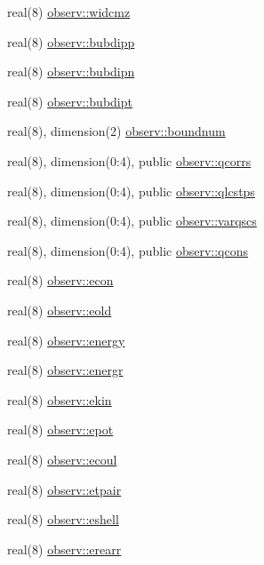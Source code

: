 \begin{DoxyCompactItemize}
\item 
real(8) \hyperlink{namespaceobserv_a128f96e19967460b67ef885021d9fb0a}{observ\+::widcmz}
\item 
real(8) \hyperlink{namespaceobserv_a4ffb7986e7585b019cc482528f6da8f7}{observ\+::bubdipp}
\item 
real(8) \hyperlink{namespaceobserv_a857bf3d3540f2e6896e8f13f0dc55642}{observ\+::bubdipn}
\item 
real(8) \hyperlink{namespaceobserv_a63fc9eb0b13b60cb7dc0df0c8c330966}{observ\+::bubdipt}
\item 
real(8), dimension(2) \hyperlink{namespaceobserv_aa4177808cf29e88750de09e971052d7c}{observ\+::boundnum}
\item 
real(8), dimension(0\+:4), public \hyperlink{namespaceobserv_a16d0b249b06168c260b7a7752729f60a}{observ\+::qcorrs}
\item 
real(8), dimension(0\+:4), public \hyperlink{namespaceobserv_a6a9c12cdfb362e6d2af583d7eb17d32f}{observ\+::qlcstps}
\item 
real(8), dimension(0\+:4), public \hyperlink{namespaceobserv_afbab940fd904214e88cead4570ed5a45}{observ\+::varqscs}
\item 
real(8), dimension(0\+:4), public \hyperlink{namespaceobserv_aa5526a16e8f0982dec32b788e8c13eae}{observ\+::qcons}
\item 
real(8) \hyperlink{namespaceobserv_aab2b361228c2be9aacc647898d20602c}{observ\+::econ}
\item 
real(8) \hyperlink{namespaceobserv_a1988e691b9c7e5f98cb2e13a4a229908}{observ\+::eold}
\item 
real(8) \hyperlink{namespaceobserv_a49a7e3ba548450307b3a2c22ace8b3f3}{observ\+::energy}
\item 
real(8) \hyperlink{namespaceobserv_a8e556cf28d2d577177523975fb47467b}{observ\+::energr}
\item 
real(8) \hyperlink{namespaceobserv_a7df2eeed60a05d3f29ca04013bba2081}{observ\+::ekin}
\item 
real(8) \hyperlink{namespaceobserv_a87e633bdcc50c87ba74f4f69c97c8534}{observ\+::epot}
\item 
real(8) \hyperlink{namespaceobserv_ac0a63f15b5c3dd97c7869b7748679212}{observ\+::ecoul}
\item 
real(8) \hyperlink{namespaceobserv_ac535470bfdf0cb2be9051d1ad7f2b4bf}{observ\+::etpair}
\item 
real(8) \hyperlink{namespaceobserv_ac8fdfe12d0195f54b5270f0787d8a4be}{observ\+::eshell}
\item 
real(8) \hyperlink{namespaceobserv_aadc4a7afed808cde5967554c7cf067d6}{observ\+::erearr}

\end{DoxyCompactItemize}
